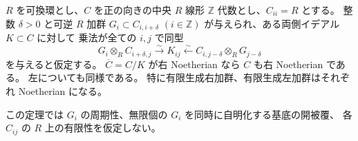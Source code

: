 \begin{theorem}
\label{thm:patch-normal-family}
$R$ を可換環とし、$C$ を正の向きの中央 $R$ 線形 $\mathbb Z$ 代数とし、$C_{ii}=R$ とする。
整数 $\delta>0$ と可逆 $R$ 加群
$G_i\subset C_{i,i+\delta}$ $(i\in\mathbb Z)$ が与えられ、ある両側イデアル $K\subset C$ に対して
乗法が全ての $i,j$ で同型
\begin{equation}\label{eq:patch-normal-family-input}
 G_i\otimes_R C_{i+\delta,j}
       \xrightarrow{\sim}K_{ij}
       \xleftarrow{\sim}C_{i,j-\delta}\otimes_R G_{j-\delta}
\end{equation}
を与えると仮定する。
$\overline C=C/K$ が右 Noetherian なら $C$ も右 Noetherian である。
左についても同様である。
特に有限生成右加群、有限生成左加群はそれぞれ Noetherian になる。

この定理では $G_i$ の周期性、無限個の $G_i$ を同時に自明化する基底の開被覆、
各 $C_{ij}$ の $R$ 上の有限性を仮定しない。
\end{theorem}

